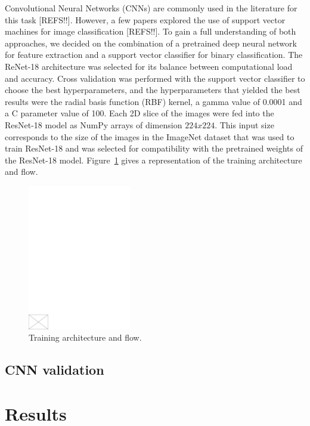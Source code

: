 Convolutional Neural Networks (CNNs) are commonly used in the literature for this task [REFS!!]. However, a few papers explored the use of support vector machines for image classification [REFS!!]. To gain a full understanding of both approaches, we decided on the combination of a pretrained deep neural network for feature extraction and a support vector classifier for binary classification. The ReNet-18 architecture was selected for its balance between computational load and accuracy. Cross validation was performed with the support vector classifier to choose the best hyperparameters, and the hyperparameters that yielded the best results were the radial basis function (RBF) kernel, a gamma value of 0.0001 and a C parameter value of 100. Each 2D slice of the images were fed into the ResNet-18 model as NumPy arrays of dimension $224x224$. This input size corresponds to the size of the images in the ImageNet dataset that was used to train ResNet-18 and was selected for compatibility with the pretrained weights of the ResNet-18 model. Figure~\ref{fig:training_architecture} gives a representation of the training architecture and flow.
%
\begin{figure}
    \centering
    \includegraphics[width=0.4\textwidth]{./figs/empty.pdf} %
    \caption{Training architecture and flow.}\label{fig:training_architecture}
\end{figure}

%
\subsection{CNN validation}

\section{Results}

